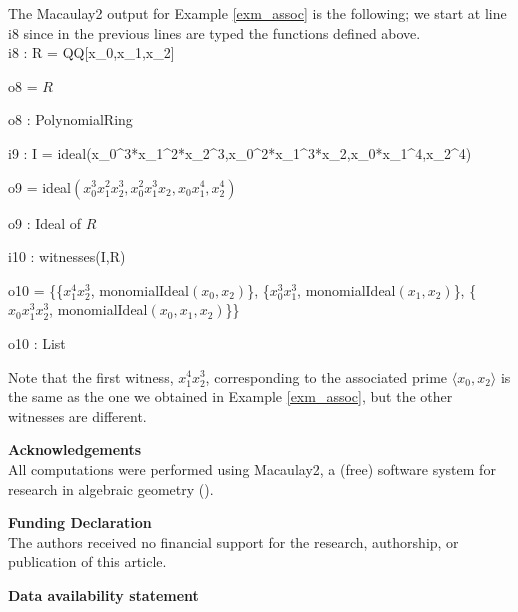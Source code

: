 \documentclass[11pt]{amsart}   %
\begin{document}
The Macaulay2 output for Example \ref{exm_assoc} is the following; we start at line i8 since in the previous lines are typed the functions defined above.\\

i8 : R = QQ[x\_0,x\_1,x\_2]

\medskip

o8 = $R$

\medskip

o8 : PolynomialRing

\medskip

i9 : I = ideal(x\_0\textasciicircum3*x\_1\textasciicircum2*x\_2\textasciicircum3,x\_0\textasciicircum2*x\_1\textasciicircum3*x\_2,x\_0*x\_1\textasciicircum4,x\_2\textasciicircum4)

\medskip

o9 = ideal$(x_0^3x_1^2x_2^3,x_0^2x_1^3x_2,x_0x_1^4,x_2^4)$

\medskip

o9 : Ideal of $R$

\medskip

i10 : witnesses(I,R)

\medskip

o10 = \{\{$x_1^4x_2^3$, monomialIdeal$(x_0,x_2)$\}, \{$x_0^3x_1^3$, monomialIdeal$(x_1,x_2)$\}, \{$x_0x_1^3x_2^3$, monomialIdeal$(x_0,x_1,x_2)$\}\}

\medskip

o10 : List

Note that the first witness, $x_1^4x_2^3$, corresponding to the associated prime $\langle x_0,x_2\rangle$ is the same as the one we obtained in Example \ref{exm_assoc}, but the other witnesses are different.


\vspace{1.2cm}

\noindent\textbf{Acknowledgements}\\

All computations were performed using Macaulay2, a (free) software system for research in algebraic geometry (\cite{GrSt}).

\bigskip
\noindent\textbf{Funding Declaration}\\

The authors received no financial support for the research, authorship, or publication of this article.

\bigskip

\noindent\textbf{Data availability statement}\\
\end{document}
